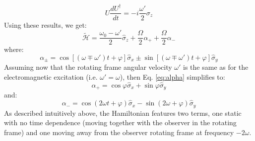 \documentclass[a4paper,11pt]{article}
\begin{document}
\begin{equation}
    U \frac{dU^{\dagger}}{dt} = -i \frac{\omega'}{2}\sigma_z
\end{equation}
Using these results, we get:
\begin{equation}
    \widetilde{\mathcal{H}} = \frac{\omega_0-\omega'}{2}\hat{\sigma}_z + \frac{\Omega}{2} \alpha_+ + \frac{\Omega}{2} \alpha_-
\end{equation}
where:
\begin{equation}
\label{eq:alpha}
    \alpha_{\pm} = \cos \left[ \left( \omega \mp \omega'  \right)t + \varphi \right] \hat{\sigma}_x \pm \sin \left[ \left( \omega \mp \omega'  \right)t + \varphi \right] \hat{\sigma}_y
\end{equation}
Assuming now that the rotating frame angular velocity $\omega'$ is the same as for the electromagnetic excitation (i.e. $\omega' = \omega$), then Eq. \ref{eq:alpha} simplifies to:
\begin {equation}
\alpha_+ = \cos \varphi \hat{\sigma}_x +  \sin \varphi \hat{\sigma}_y
\end{equation}
and:
\begin{equation}
    \alpha_- = \cos \left( 2 \omega t + \varphi \right) \hat{\sigma}_x - \sin \left( 2\omega + \varphi \right) \hat{\sigma}_y
\end{equation}
As described intuitively above, the Hamiltonian features two terms, one static with no time dependence (moving together with the observer in the rotating frame) and one moving away from the observer rotating frame at frequency $-2 \omega$.
\end{document}
